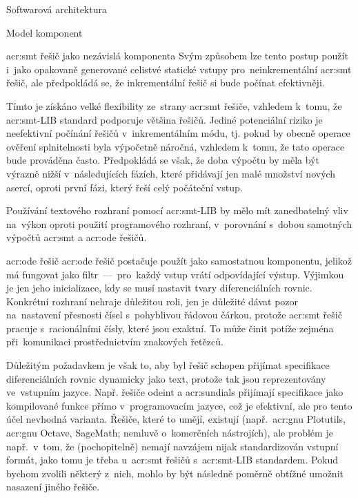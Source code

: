 \documentclass[thesis=M,czech]{FITthesis}[2012/06/26]
\newcommand{\acrlabel}[1]{acr:#1}
\newcommand{\acr}[1]{\acrshort{\acrlabel{#1}}}
\begin{document}
\begin{section}{Softwarová architektura}
\begin{subsection}{Model komponent}
\begin{subsubsection}{\acr{smt} řešič jako nezávislá komponenta}
Svým způsobem lze tento postup použít
i~jako opakovaně generované celistvé statické vstupy
pro~neinkrementální \acr{smt} řešič,
ale předpokládá se, že inkrementální řešič
si bude počínat efektivněji.

Tímto je získáno velké flexibility
ze~strany \acr{smt} řešiče,
vzhledem k~tomu, že \acr{smt}-LIB standard
podporuje většina řešičů.
Jediné potenciální riziko
je neefektivní počínání řešičů
v~inkrementálním módu,
tj. pokud by obecně operace ověření splnitelnosti
byla výpočetně náročná,
vzhledem k~tomu, že tato operace bude prováděna často.
Předpokládá se však,
že doba výpočtu by měla být výrazně nižší
v~následujících fázích,
které přidávají jen malé množství nových asercí,
oproti první fázi,
který řeší celý počáteční vstup.

Používání textového rozhraní pomocí \acr{smt}-LIB
by mělo mít zanedbatelný vliv na~výkon
oproti použití programového rozhraní,
v~porovnání s~dobou samotných výpočtů
\acr{smt} a \acr{ode} řešičů.
\end{subsubsection} %


\begin{subsubsection}{\acr{ode} řešič}\label{sss:design:arch:comp:ode}
\acr{ode} řešič postačuje použít jako samostatnou komponentu,
jelikož má fungovat jako
filtr~---~pro~každý vstup vrátí odpovídající výstup.
Výjimkou je jen jeho inicializace,
kdy se musí nastavit tvary diferenciálních rovnic.
Konkrétní rozhraní nehraje důležitou roli,
jen je důležité dávat pozor na~nastavení přesnosti
čísel s~pohyblivou řádovou čárkou,
protože \acr{smt} řešič pracuje s~racionálními čísly,
které jsou exaktní. To může činit potíže zejména
při~komunikaci prostřednictvím znakových řetězců.

Důležitým požadavkem je však to,
aby byl řešič schopen přijímat
specifikace diferenciálních rovnic
dynamicky jako text,
protože tak jsou reprezentovány ve~vstupním jazyce.
Např. řešiče odeint a \acr{sundials}
přijímají specifikace jako kompilované funkce
přímo v~programovacím jazyce,
což je efektivní, ale pro tento účel
nevhodná varianta.
Řešiče, které to umějí, existují
(např.~\acr{gnu} Plotutils,
\acr{gnu} Octave, SageMath;
nemluvě o~komerčních nástrojích),
ale problém je např.~v~tom,
že (pochopitelně) nemají navzájem
nijak standardizován vstupní formát,
jako tomu je třeba u~\acr{smt} řešičů
s~\acr{smt}-LIB standardem.
Pokud bychom zvolili některý z~nich,
mohlo by být následně poměrně obtížné umožnit
nasazení jiného řešiče.


\end{subsubsection}
\end{subsection}
\end{section}
\end{document}

